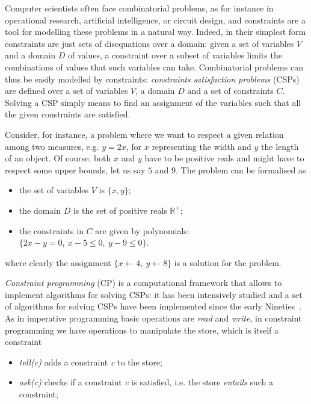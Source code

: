 \documentclass{llncs}
\begin{document}
Computer scientists often face combinatorial problems, as for instance in operational research, artificial intelligence, or circuit design,
and constraints are a tool for modelling these problems in a natural way. 
Indeed, in their simplest form constraints are just sets of disequations over a domain: given a set of variables $V$ and a domain $D$ of values, 
a constraint over a subset of variables limits the combinations of values that such variables can take. 
Combinatorial problems can thus be easily modelled by constraints: \emph{constraints satisfaction problems} (CSPs)
are defined over a set of variables $V$, a domain $D$ and a set of constraints $C$. Solving a CSP simply means 
to find an assignment of the variables such that all the given constraints are satisfied. 

Consider, for instance, a problem where we want to respect a given relation among two measures, e.g. $y = 2x$, for $x$ representing the width and $y$ the length of an object. 
Of course, both $x$ and $y$ have to be positive reals and might have to respect some upper bounds, let us say $5$ and $9$. The problem can be formalised as
%
\begin{itemize}
	\item the set of variables $V$ is $\{x,y\}$;
	\item the domain $D$ is the set of positive reals $\mathbb{R}^+$;
	\item the constraints in $C$ are given by polynomials: $\{2x-y = 0, \ x-5 \leq 0, \ y-9 \leq 0\}$.
\end{itemize}
where clearly the assignment $\{x \leftarrow 4, \ y \leftarrow 8\}$ is a solution for the problem.

\newpage
\emph{Constraint programming} (CP) is a computational framework that allows to implement algorithms for solving CSPs:  
it has been intensively studied and a set of algorithms for solving CSPs have been implemented since the early Nineties~\cite{aijour}. 
%
As in imperative programming basic operations are \emph{read} and \emph{write}, in constraint programming we have operations to manipulate the store, which is itself a constraint

\begin{itemize}
	\item \emph{tell(c)} adds a constraint \emph{c} to the store;
	\item \emph{ask(c)} checks if a constraint \emph{c} is satisfied, i.e. the store \emph{entails} such a constraint;
\end{itemize}
\end{document}
